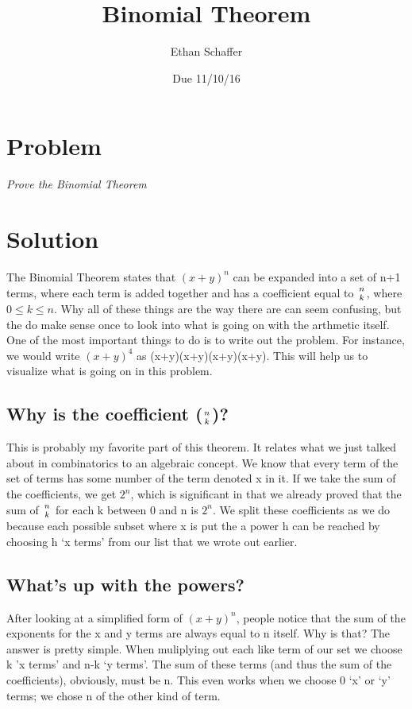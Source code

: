 \documentclass[11pt]{article} %
\title{Binomial Theorem}
\author{Ethan Schaffer}
\date{Due 11/10/16}
\newcommand\tab[1][1cm]{\hspace*{#1}}
\begin{document}
\maketitle


\section* {Problem}
\textit{Prove the Binomial Theorem}

\section*{Solution}
\tab The Binomial Theorem states that $(x+y)^n$ can be expanded into a set of n+1 terms, where each term is added together and has a coefficient equal to $n\atop k$, where  $0 \leq  k \leq n$. Why all of these things are the way there are can seem confusing, but the do make sense once to look into what is going on with the arthmetic itself. One of the most important things to do is to write out the problem. For instance, we would write $(x+y)^4$ as (x+y)(x+y)(x+y)(x+y). This will help us to visualize what is going on in this problem.

\subsection*{Why is the coefficient ($n\atop k$)?}
\tab This is probably my favorite part of this theorem. It relates what we just talked about in combinatorics to an algebraic concept. We know that every term of the set of terms has some number of the term denoted x in it. If we take the sum of the coefficients, we get $2^n$, which is significant in that we already proved that the sum of $n \atop k$ for each k between 0 and n is $2^n$. We split these coefficients as we do because each possible subset where x is put the a power h can be reached by choosing h `x terms' from our list that we wrote out earlier. 

\subsection*{What's up with the powers?}
\tab After looking at a simplified form of $(x+y)^n$, people notice that the sum of the exponents for the x and y terms are always equal to n itself. Why is that? The answer is pretty simple. When muliplying out each like term of our set we choose k 'x terms' and n-k `y terms'. The sum of these terms (and thus the sum of the coefficients), obviously, must be n. This even works when we choose 0 `x' or `y' terms; we chose n of the other kind of term.
\end{document}
